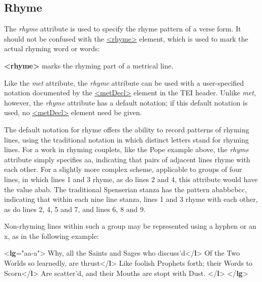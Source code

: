 \subsection[{Rhyme}]{Rhyme}\label{VERH}\par
The {\itshape rhyme} attribute is used to specify the rhyme pattern of a verse form. It should not be confused with the \hyperref[TEI.rhyme]{<rhyme>} element, which is used to mark the actual rhyming word or words: 
\begin{sansreflist}
  
\item [\textbf{<rhyme>}] marks the rhyming part of a metrical line.
\end{sansreflist}
\par
Like the {\itshape met} attribute, the {\itshape rhyme} attribute can be used with a user-specified notation documented by the \hyperref[TEI.metDecl]{<metDecl>} element in the TEI header. Unlike {\itshape met}, however, the {\itshape rhyme} attribute has a default notation; if this default notation is used, no \hyperref[TEI.metDecl]{<metDecl>} element need be given.\par
The default notation for rhyme offers the ability to record patterns of rhyming lines, using the traditional notation in which distinct letters stand for rhyming lines. For a work in rhyming couplets, like the Pope example above, the {\itshape rhyme} attribute simply specifies aa, indicating that pairs of adjacent lines rhyme with each other. For a slightly more complex scheme, applicable to groups of four lines, in which lines 1 and 3 rhyme, as do lines 2 and 4, this attribute would have the value abab. The traditional Spenserian stanza has the pattern ababbcbcc, indicating that within each nine line stanza, lines 1 and 3 rhyme with each other, as do lines 2, 4, 5 and 7, and lines 6, 8 and 9.\par
Non-rhyming lines within such a group may be represented using a hyphen or an x, as in the following example: \par\bgroup{}\exampleFont \begin{shaded}\noindent\mbox{}{<\textbf{lg}\hspace*{1em}{rhyme}="{aa-a}">}\mbox{}\newline 
{}Why, all the Saints and Sages who discuss'd{</\textbf{l}>}\mbox{}\newline 
{}Of the Two Worlds so learnedly, are thrust{</\textbf{l}>}\mbox{}\newline 
{}Like foolish Prophets forth; their Words to Scorn{</\textbf{l}>}\mbox{}\newline 
{}Are scatter'd, and their Mouths are stopt with Dust. {</\textbf{l}>}\mbox{}\newline 
{</\textbf{lg}>}\end{shaded}\egroup\par \par
